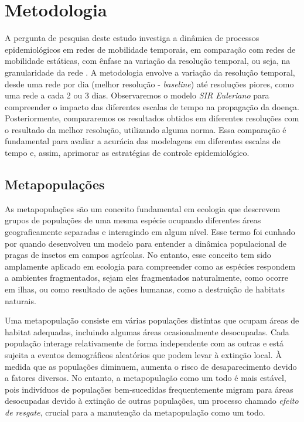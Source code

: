 \chapter{Metodologia}

A pergunta de pesquisa deste estudo investiga a dinâmica de processos epidemiológicos em redes de mobilidade temporais, em comparação com redes de mobilidade estáticas, com ênfase na variação da resolução temporal, ou seja, na granularidade da rede \cite{Pedrycz2002}. A metodologia envolve a variação da resolução temporal, desde uma rede por dia (melhor resolução - \textit{baseline}) até resoluções piores, como uma rede a cada 2 ou 3 dias. Observaremos o modelo \textit{SIR Euleriano} para compreender o impacto das diferentes escalas de tempo na propagação da doença. Posteriormente, compararemos os resultados obtidos em diferentes resoluções com o resultado da melhor resolução, utilizando alguma norma. Essa comparação é fundamental para avaliar a acurácia das modelagens em diferentes escalas de tempo e, assim, aprimorar as estratégias de controle epidemiológico.

\section{Metapopulações}

As metapopulações são um conceito fundamental em ecologia que descrevem grupos de populações de uma mesma espécie ocupando diferentes áreas geograficamente separadas e interagindo em algum nível. Esse termo foi cunhado por  quando desenvolveu um modelo para entender a dinâmica populacional de pragas de insetos em campos agrícolas. No entanto, esse conceito tem sido amplamente aplicado em ecologia para compreender como as espécies respondem a ambientes fragmentados, sejam eles fragmentados naturalmente, como ocorre em ilhas, ou como resultado de ações humanas, como a destruição de habitats naturais.

Uma metapopulação consiste em várias populações distintas que ocupam áreas de habitat adequadas, incluindo algumas áreas ocasionalmente desocupadas. Cada população interage relativamente de forma independente com as outras e está sujeita a eventos demográficos aleatórios que podem levar à extinção local. À medida que as populações diminuem, aumenta o risco de desaparecimento devido a fatores diversos. No entanto, a metapopulação como um todo é mais estável, pois indivíduos de populações bem-sucedidas frequentemente migram para áreas desocupadas devido à extinção de outras populações, um processo chamado \textit{efeito de resgate}, crucial para a manutenção da metapopulação como um todo.

